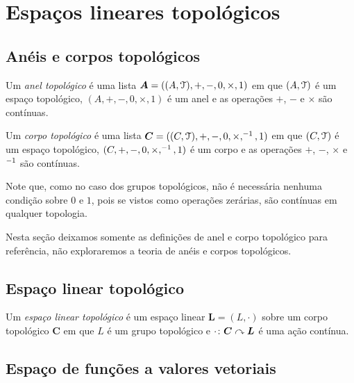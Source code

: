 \chapter{Espaços lineares topológicos}

\section{Anéis e corpos topológicos}

\begin{definition}
Um \emph{anel topológico} é uma lista $\bm A = ((A,\mathcal{T}),+,-,0,\times,1)$ em que $(A,\mathcal{T})$ é um espaço topológico, $(A,+,-,0,\times,1)$ é um anel e as operações $+$, $-$ e $\times$ são contínuas.

Um \emph{corpo topológico} é uma lista $\bm C = ((C,\mathcal{T}),+,-,0,\times,^{-1},1)$ em que $(C,\mathcal{T})$ é um espaço topológico, $(C,+,-,0,\times,^{-1},1)$ é um corpo e as operações $+$, $-$, $\times$ e $^{-1}$ são contínuas.
\end{definition}

Note que, como no caso dos grupos topológicos, não é necessária nenhuma condição sobre $0$ e $1$, pois se vistos como operações zerárias, são contínuas em qualquer topologia.

Nesta seção deixamos somente as definições de anel e corpo topológico para referência, não exploraremos a teoria de anéis e corpos topológicos.

\section{Espaço linear topológico}

\begin{definition}
Um \emph{espaço linear topológico} é um espaço linear $\bm L = (L,\cdot)$ sobre um corpo topológico $\bm C$ em que $L$ é um grupo topológico e $\cdot\colon \bm C \curvearrowright \bm L$ é uma ação contínua.
\end{definition}

\section{Espaço de funções a valores vetoriais}

